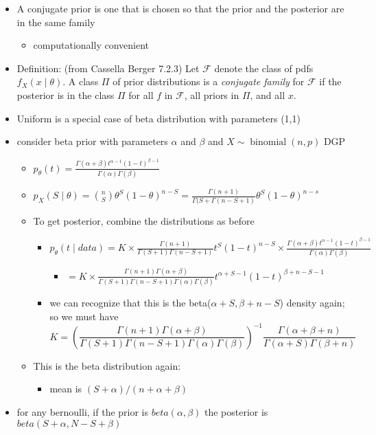 \documentclass[11pt]{article}
\begin{document}
\begin{itemize}
\item A conjugate prior is one that is chosen so that the prior and
       the posterior are in the same family
\begin{itemize}
\item computationally convenient
\end{itemize}
\item Definition: (from Cassella Berger 7.2.3)  Let $\mathcal{F}$ denote the class of pdfs $f_X(x \mid \theta)$.  A class $\Pi$
       of prior distributions is a \emph{conjugate family} for $\mathcal F$ if the posterior is in the class $\Pi$ for all $f$ in $\mathcal F$,
       all priors in $\Pi$, and all $x$.
\item Uniform is a special case of beta distribution with
       parameters (1,1)
\item consider beta prior with parameters $\alpha$ and $\beta$ and
       $X \sim \operatorname{binomial}(n,p)$ DGP
\begin{itemize}
\item $p_\theta(t) = \frac{\Gamma(\alpha + \beta) t^{\alpha-1}
         (1-t)^{\beta-1}}{\Gamma(\alpha) \Gamma(\beta)}$
     \item $p_{X}(S \mid \theta) = \binom{n}{S} \theta^S
       (1-\theta)^{n-S} = \frac{\Gamma(n + 1)}{\Gamma(S + \Gamma(n - S
         + 1)} \theta^S (1-\theta)^{n-s}$
\item To get posterior, combine the distributions as before
\begin{itemize}
\item $p_\theta(t \mid data) 
           = K \times \frac{\Gamma(n + 1)}{\Gamma(S + 1) \Gamma(n - S + 1)} t^S (1-t)^{n-S} \times \frac{\Gamma(\alpha + \beta) t^{\alpha-1} (1-t)^{\beta-1}}{\Gamma(\alpha) \Gamma(\beta)}$
\begin{itemize}
\item $= K \times \frac{\Gamma(n + 1) \Gamma(\alpha + \beta)}{\Gamma(S + 1) \Gamma(n - S + 1) \Gamma(\alpha) \Gamma(\beta)} t^{\alpha + S - 1} (1 - t)^{\beta + n - S - 1}$
\end{itemize}
\item we can recognize that this is the beta($\alpha + S, \beta + n - S$) density again; so we must have 
           \[ K = (\frac{\Gamma(n + 1) \Gamma(\alpha + \beta)}{\Gamma(S + 1) \Gamma(n - S + 1)\Gamma(\alpha)\Gamma(\beta)})^{-1} \frac{\Gamma(\alpha + \beta + n)}{\Gamma(\alpha + S)\Gamma(\beta + n)} \]
\end{itemize}
\item This is the beta distribution again:
\begin{itemize}
\item mean is $(S + \alpha) / (n + \alpha + \beta)$
\end{itemize}
\end{itemize}
\item for any bernoulli, if the prior is $beta(\alpha,\beta)$ the
       posterior is $beta(S + \alpha, N - S + \beta)$
\end{itemize}
\end{document}
